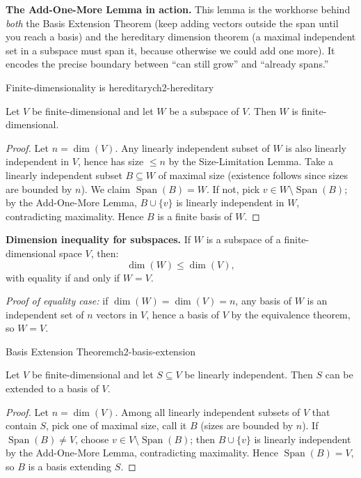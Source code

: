 \begin{policynote}
\textbf{The Add-One-More Lemma in action.}
This lemma is the workhorse behind \emph{both} the Basis Extension Theorem (keep adding vectors outside the span until you reach a basis) and the hereditary dimension theorem (a maximal independent set in a subspace must span it, because otherwise we could add one more).
It encodes the precise boundary between ``can still grow'' and ``already spans.''
\end{policynote}

\begin{theorem}{Finite-dimensionality is hereditary}{ch2-hereditary}

Let $V$ be finite-dimensional and let $W$ be a subspace of $V$. Then $W$ is finite-dimensional.

\begin{proof}

Let $n=\dim(V)$. Any linearly independent subset of $W$ is also linearly independent in $V$, hence has size $\le n$ by the Size-Limitation Lemma. Take a linearly independent subset $B\subseteq W$ of maximal size (existence follows since sizes are bounded by $n$). We claim $\operatorname{Span}(B)=W$. If not, pick $v\in W\setminus \operatorname{Span}(B)$; by the Add-One-More Lemma, $B\cup\{v\}$ is linearly independent in $W$, contradicting maximality. Hence $B$ is a finite basis of $W$.

\end{proof}

\end{theorem}

\begin{keyformula}
\textbf{Dimension inequality for subspaces.}
If $W$ is a subspace of a finite-dimensional space $V$, then:
\[
\dim(W)\le\dim(V),
\]
with equality if and only if $W=V$.

\emph{Proof of equality case:} if $\dim(W)=\dim(V)=n$, any basis of $W$ is an independent set of $n$ vectors in $V$, hence a basis of $V$ by the equivalence theorem, so $W=V$.
\end{keyformula}

\begin{theorem}{Basis Extension Theorem}{ch2-basis-extension}

Let $V$ be finite-dimensional and let $S\subseteq V$ be linearly independent. Then $S$ can be extended to a basis of $V$.

\begin{proof}

Let $n=\dim(V)$. Among all linearly independent subsets of $V$ that contain $S$, pick one of maximal size, call it $B$ (sizes are bounded by $n$). If $\operatorname{Span}(B)\neq V$, choose $v\in V\setminus\operatorname{Span}(B)$; then $B\cup\{v\}$ is linearly independent by the Add-One-More Lemma, contradicting maximality. Hence $\operatorname{Span}(B)=V$, so $B$ is a basis extending $S$.

\end{proof}

\end{theorem}

